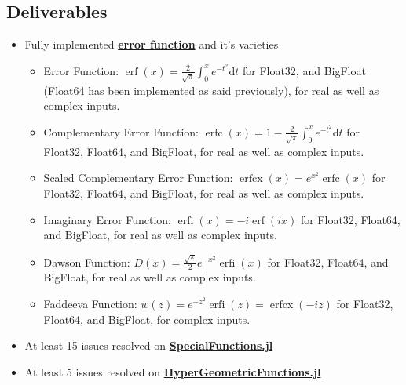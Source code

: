 \documentclass{article}
\theoremstyle{mytheoremstyle}
\theoremstyle{mytheoremstyle}
\theoremstyle{myproblemstyle}
\begin{document}
    \subsection*{Deliverables}
      \begin{itemize}
        \item Fully implemented \href{https://github.com/JuliaMath/SpecialFunctions.jl/blob/master/src/erf.jl}{\textbf{error function}} and it's varieties \cite{error function}
          \begin{itemize}
            \item Error Function: $\operatorname{erf } (x)=\frac{2 }{\sqrt{\pi } }\int_{0}^{x} e ^{-t^2}\text{d}t$ for Float32, and BigFloat (Float64 has been implemented as said previously), for real as well as complex inputs.
            \item Complementary Error Function: $\operatorname{erfc } (x)=1- \frac{2 }{\sqrt{\pi } }\int_{0}^{x} e ^{-t^2}\text{d}t$ for Float32, Float64, and BigFloat, for real as well as complex inputs.
            \item Scaled Complementary Error Function: $\operatorname{erfcx } (x)=e ^{x^2 } \operatorname{erfc} (x)$ for Float32, Float64, and BigFloat, for real as well as complex inputs.
            \item Imaginary Error Function: $\operatorname{erfi } (x)= -i \operatorname{erf} (ix)$ for Float32, Float64, and BigFloat, for real as well as complex inputs.
            \item Dawson Function: $D (x)=\frac{\sqrt{\pi } }{2 }e ^{-x^2 } \operatorname{erfi} (x)$ for Float32, Float64, and BigFloat, for real as well as complex inputs.
            \item Faddeeva Function: $w (z)=e ^{-z^2 } \operatorname{erfi} (z)= \operatorname{erfcx}(-iz)$ for Float32, Float64, and BigFloat, for complex inputs.
          \end{itemize}
        \item At least 15 issues resolved on \href{https://github.com/JuliaMath/SpecialFunctions.jl/issues}{\textbf{SpecialFunctions.jl}} 
        \item At least 5 issues resolved on \href{https://github.com/JuliaMath/HypergeometricFunctions.jl/issues}{\textbf{HyperGeometricFunctions.jl}} 

\end{itemize}
\end{document}
